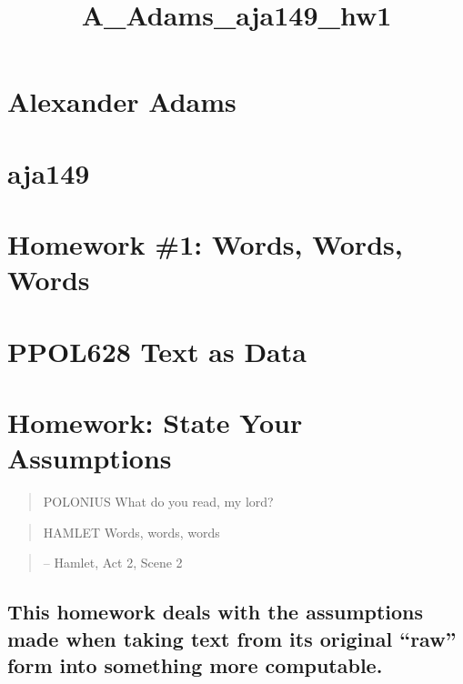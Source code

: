 \documentclass[11pt]{article}
\title{A\_Adams\_aja149\_hw1}
\begin{document}
    
    \maketitle
    
    

    
    \hypertarget{alexander-adams}{%
\section{Alexander Adams}\label{alexander-adams}}

\hypertarget{aja149}{%
\section{aja149}\label{aja149}}

\hypertarget{homework-1-words-words-words}{%
\section{Homework \#1: Words, Words,
Words}\label{homework-1-words-words-words}}

\hypertarget{ppol628-text-as-data}{%
\section{PPOL628 Text as Data}\label{ppol628-text-as-data}}

    \hypertarget{homework-state-your-assumptions}{%
\section{Homework: State Your
Assumptions}\label{homework-state-your-assumptions}}

\begin{quote}
POLONIUS What do you read, my lord?
\end{quote}

\begin{quote}
HAMLET Words, words, words
\end{quote}

\begin{quote}
-- Hamlet, Act 2, Scene 2
\end{quote}

\hypertarget{this-homework-deals-with-the-assumptions-made-when-taking-text-from-its-original-raw-form-into-something-more-computable.}{%
\subsection{This homework deals with the assumptions made when taking
text from its original ``raw'' form into something more
computable.}\label{this-homework-deals-with-the-assumptions-made-when-taking-text-from-its-original-raw-form-into-something-more-computable.}}
\end{document}
